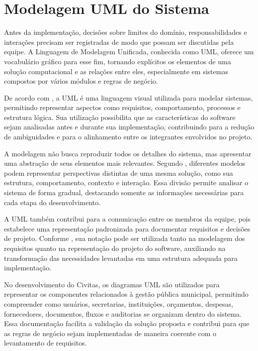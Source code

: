 

\iffalse
\chapter{Modelagem UML do Sistema}

Antes da implementação, decisões sobre limites do domínio, responsabilidades e interações precisam ser registradas de modo que possam ser discutidas pela equipe. A Linguagem de Modelagem Unificada, conhecida como UML, oferece um vocabulário gráfico para esse fim, tornando explícitos os elementos de uma solução computacional e as relações entre eles, especialmente em sistemas compostos por vários módulos e regras de negócio.

De acordo com \textcite{Guedes2018}, a UML é uma linguagem visual utilizada para modelar sistemas, permitindo representar aspectos como requisitos, comportamento, processos e estrutura lógica. Sua utilização possibilita que as características do software sejam analisadas antes e durante sua implementação, contribuindo para a redução de ambiguidades e para o alinhamento entre os integrantes envolvidos no projeto.

A modelagem não busca reproduzir todos os detalhes do sistema, mas apresentar uma abstração de seus elementos mais relevantes. Segundo \textcite{Sommerville2018ES10}, diferentes modelos podem representar perspectivas distintas de uma mesma solução, como sua estrutura, comportamento, contexto e interação. Essa divisão permite analisar o sistema de forma gradual, destacando somente as informações necessárias para cada etapa do desenvolvimento.

A UML também contribui para a comunicação entre os membros da equipe, pois estabelece uma representação padronizada para documentar requisitos e decisões de projeto. Conforme \textcite{PressmanMaxim2021}, sua notação pode ser utilizada tanto na modelagem dos requisitos quanto na representação do projeto do software, auxiliando na transformação das necessidades levantadas em uma estrutura adequada para implementação.

No desenvolvimento do Civitas, os diagramas UML são utilizados para representar os componentes relacionados à gestão pública municipal, permitindo compreender como usuários, secretarias, instituições, orçamentos, despesas, fornecedores, documentos, fluxos e auditorias se organizam dentro do sistema. Essa documentação facilita a validação da solução proposta e contribui para que as regras de negócio sejam implementadas de maneira coerente com o levantamento de requisitos.

